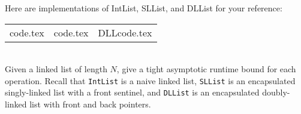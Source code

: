 \begin{blocksection}
\question Here are implementations of IntList, SLList, and DLList for your reference:
\begin{tabular}{ c c c }
 {code.tex} & {code.tex} &  {DLLcode.tex} \\ 
\end{tabular}\\

Given a linked list of length $N$, give a tight asymptotic runtime
bound for each operation. Recall that \lstinline$IntList$ is a naive linked
list, \lstinline$SLList$ is an encapsulated singly-linked list with a front
sentinel, and \lstinline$DLList$ is an encapsulated doubly-linked list with
front and back pointers.
\end{blocksection}
\ifprintanswers
